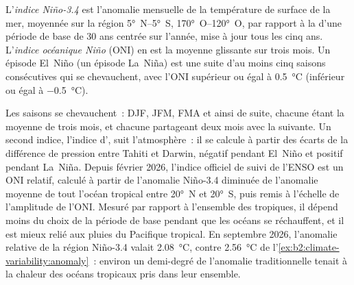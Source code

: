 \begin{definition}\label{def:b2:climate-variability:oni}
L'\emph{indice Niño-3.4} est l'anomalie mensuelle de la température de surface de la mer,
moyennée sur la région \ang{5}~N--\ang{5}~S, \ang{170}~O--\ang{120}~O, par rapport à la 
d'une période de base de 30 ans centrée sur l'année, mise à jour tous les cinq ans. L'\emph{indice océanique Niño}
(ONI) en est la moyenne glissante sur trois mois. Un épisode El~Niño (un épisode La~Niña) est une suite
d'au moins cinq saisons consécutives qui se chevauchent, avec l'ONI supérieur ou égal à \qty{+0.5}{\celsius}
(inférieur ou égal à \qty{-0.5}{\celsius}).
\end{definition}

Les saisons se chevauchent~: DJF, JFM, FMA et ainsi de suite, chacune étant la moyenne de trois mois,
et chacune partageant deux mois avec la suivante. Un second indice, l'indice d', suit l'atmosphère~:
il se calcule à partir des écarts de la différence de pression entre Tahiti et Darwin,
négatif pendant El~Niño et positif pendant La~Niña. Depuis février 2026, l'indice officiel de suivi de l'ENSO
est un ONI relatif, calculé à partir de l'anomalie Niño-3.4 diminuée de l'anomalie moyenne de tout l'océan tropical
entre \ang{20}~N et \ang{20}~S, puis remis à l'échelle de l'amplitude de l'ONI. Mesuré par rapport à l'ensemble des tropiques,
il dépend moins du choix de la période de base pendant que les océans se réchauffent,
et il est mieux relié aux pluies du Pacifique tropical. En septembre 2026, l'anomalie relative de la région Niño-3.4
valait \qty{2.08}{\celsius}, contre \qty{2.56}{\celsius} de l'\cref{ex:b2:climate-variability:anomaly}~: environ un
demi-degré de l'anomalie traditionnelle tenait à
la chaleur des océans tropicaux pris dans leur ensemble.

